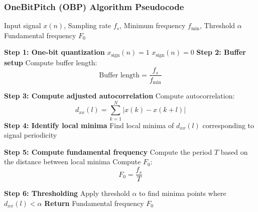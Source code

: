 \documentclass{ieeeaccess}
\begin{document}
\subsubsection{OneBitPitch (OBP) Algorithm Pseudocode}
\begin{algorithmic}[1]
\vspace{5pt} \hline \vspace{5pt}
\REQUIRE Input signal $x(n)$, Sampling rate $f_s$, Minimum frequency $f_{\text{min}}$, Threshold $\alpha$
\vspace{5pt} \hline \vspace{5pt}
\ENSURE Fundamental frequency $F_0$

\STATE \textbf{Step 1: One-bit quantization}
        \STATE $x_{\text{sign}}(n) = 1$
    \ELSE
        \STATE $x_{\text{sign}}(n) = 0$
    \ENDIF
\ENDFOR
\STATE \textbf{Step 2: Buffer setup}
\STATE Compute buffer length: 
$$
\text{Buffer length} = \frac{f_s}{f_{\text{min}}}
$$

\STATE \textbf{Step 3: Compute adjusted autocorrelation}
    \STATE Compute autocorrelation:
    $$ 
    d_{xx}(l) = \sum_{k=1}^{N} |x(k) - x(k+l)|
    $$
\ENDFOR
\STATE \textbf{Step 4: Identify local minima}
\STATE Find local minima of $d_{xx}(l)$ corresponding to signal periodicity

\STATE \textbf{Step 5: Compute fundamental frequency}
\STATE Compute the period $T$ based on the distance between local minima
\STATE Compute $F_0$:
$$
F_0 = \frac{f_s}{T}
$$

\STATE \textbf{Step 6: Thresholding}
\STATE Apply threshold $\alpha$ to find minima points where $d_{xx}(l) < \alpha$
\STATE \textbf{Return} Fundamental frequency $F_0$
\vspace{5pt} \hline \vspace{5pt}
\end{algorithmic}
\end{document}
